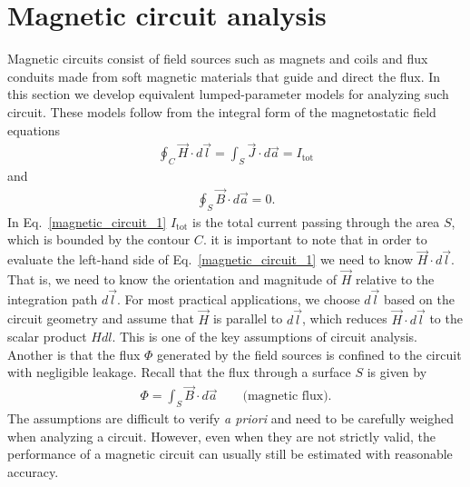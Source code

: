 \documentclass[11pt,a4paper,oneside]{book}
\numberwithin{equation}{section}
\theoremstyle{it}
\theoremstyle{definition}
\begin{document}
\section{Magnetic circuit analysis}
Magnetic circuits consist of field sources such as magnets and coils and flux conduits made from soft magnetic materials that guide and direct the flux. In this section we develop equivalent lumped-parameter models for analyzing such circuit. These models follow from the integral form of the magnetostatic field equations
\begin{equation}\label{magnetic_circuit_1}
	{\begin{aligned}
			\oint_{C} \vec{H}\cdot d\vec{l} = \int_{S}\vec{J}\cdot d\vec{a} = I_\text{tot}
	\end{aligned}}
\end{equation} 
and
\begin{equation}\label{magnetic_circuit_2}
	{\begin{aligned}
			\oint_{S} \vec{B}\cdot d\vec{a} = 0.
	\end{aligned}}
\end{equation} 
In Eq.~\eqref{magnetic_circuit_1} $I_\text{tot}$ is the total current passing through the area $S$, which is bounded by the contour $C$. it is important to note that in order to evaluate the left-hand side of Eq.~\eqref{magnetic_circuit_1} we need to know $\vec{H}\cdot d\vec{l}$.  That is, we need to know the orientation and magnitude of $\vec{H}$ relative to the integration path $d\vec{l}$. For most practical applications, we choose $d\vec{l}$ based on the circuit geometry and assume that $\vec{H}$ is parallel to $d\vec{l}$, which reduces $\vec{H}\cdot d\vec{l}$ to the scalar product $Hdl$. This is one of the key assumptions of circuit analysis. Another is that the flux $\Phi$ generated by the field sources is confined to the circuit with negligible leakage. Recall that the flux through a surface $S$ is given by
 \begin{equation}\label{magnetic_circuit_3}
 	{\begin{aligned}
 			\Phi = \int_{S} \vec{B}\cdot d\vec{a} \qquad\text{(magnetic flux).}
 	\end{aligned}}
 \end{equation} 
The assumptions are difficult to verify \textit{a priori} and need to be carefully weighed when analyzing a circuit. However, even when they are not strictly valid, the performance of a magnetic circuit can usually still be estimated with reasonable accuracy.
\end{document}
